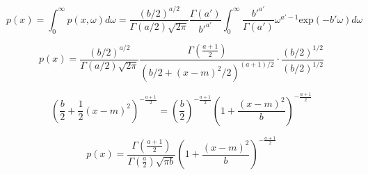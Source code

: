 \documentclass[12pt]{article}
\begin{document}
            \begin{equation}
                  p(x) = \int_0^{\infty}p(x, \omega) d\omega = \frac{(b/2)^{a/2}}{\Gamma(a/2) \sqrt{2\pi}} \frac{\Gamma(a')}{b'^{a'}} \int_0^{\infty} \frac{b'^{a'}}{\Gamma(a')}\omega^{a'-1} \text{exp}(-b' \omega) d\omega
            \end{equation}

            \begin{equation}
                  p(x) = \frac{(b/2)^{a/2}}{\Gamma(a/2) \sqrt{2\pi}} \frac{\Gamma(\frac{a+1}{2})}{(b/2 + (x-m)^2/2)^{(a+1)/2}} \cdot \frac{(b/2)^{1/2}}{(b/2)^{1/2}}
            \end{equation}

            \begin{equation}
                  \left( \frac{b}{2} + \frac{1}{2} (x-m)^2\right)^{-\frac{a+1}{2}} = \left (\frac{b}{2} \right)^{-\frac{a+1}{2}} \left( 1 + \frac{(x-m)^2}{b} \right)^{-\frac{a+1}{2}}
            \end{equation}

            \begin{equation}
                  p(x) = \frac{\Gamma \left( \frac{a+1}{2}\right)}{\Gamma(\frac{a}{2})\sqrt{\pi b}} \left (1 + \frac{(x-m)^2}{b}\right)^{-\frac{a+1}{2}}
            \end{equation}
\end{document}
